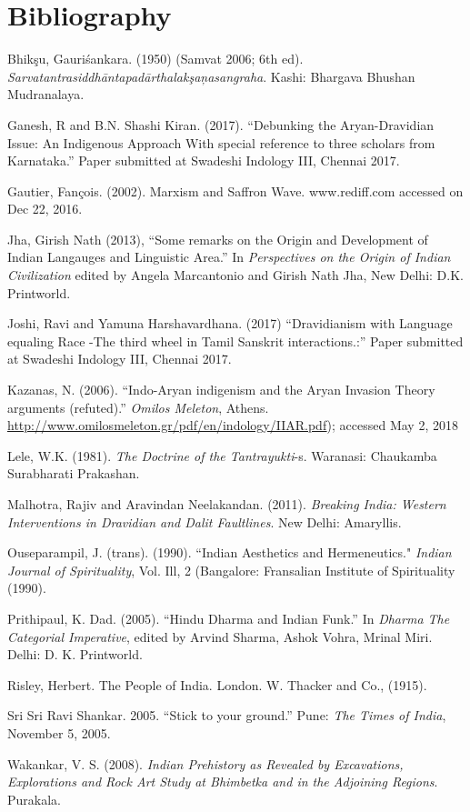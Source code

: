 \section*{Bibliography}

\begin{thebibliography}{99}
\itemsep=0pt
 Bhikşu, Gauriśankara. (1950) (Samvat 2006; 6th ed). \textit{Sarvatantrasiddhāntapadārthalakşaņasangraha}. Kashi: Bhargava Bhushan Mudranalaya.

  Ganesh, R and B.N. Shashi Kiran. (2017). “Debunking the Aryan-Dravidian Issue: An Indigenous Approach With special reference to three scholars from Karnataka.” Paper submitted at Swadeshi Indology III, Chennai 2017.

  Gautier, Fançois. (2002). Marxism and Saffron Wave. www.rediff.com accessed on Dec 22, 2016. 

  Jha, Girish Nath (2013), “Some remarks on the Origin and Development of Indian Langauges and Linguistic Area.” In \textit{Perspectives on the Origin of Indian Civilization} edited by Angela Marcantonio and Girish Nath Jha, New Delhi: D.K. Printworld.

  Joshi, Ravi and Yamuna Harshavardhana. (2017) “Dravidianism with Language equaling Race -The third wheel in Tamil Sanskrit interactions.:” Paper submitted at Swadeshi Indology III, Chennai 2017.

  Kazanas, N. (2006). “Indo-Aryan indigenism and the Aryan Invasion Theory arguments (refuted).” \textit{Omilos Meleton}, Athens. \url{http://www.omilosmeleton.gr/pdf/en/indology/IIAR.pdf}); accessed May 2, 2018

  Lele, W.K. (1981). \textit{The Doctrine of the Tantrayukti}-s. Waranasi: Chaukamba Surabharati Prakashan.

  Malhotra, Rajiv and Aravindan Neelakandan. (2011). \textit{Breaking India: Western Interventions in Dravidian and Dalit Faultlines}. New Delhi: Amaryllis.

  Ouseparampil, J. (trans). (1990). “Indian Aesthetics and Hermeneutics." \textit{Indian Journal of Spirituality}, Vol. Ill, 2 (Bangalore: Fransalian Institute of Spirituality (1990).

  Prithipaul, K. Dad. (2005). “Hindu Dharma and Indian Funk.” In \textit{Dharma The Categorial Imperative}, edited by Arvind Sharma, Ashok Vohra, Mrinal Miri. Delhi: D. K. Printworld.

  Risley, Herbert. The People of India. London. W. Thacker and Co., (1915).

  Sri Sri Ravi Shankar. 2005. “Stick to your ground.” Pune: \textit{The Times of India}, November 5, 2005.

  Wakankar, V. S. (2008). \textit{Indian Prehistory as Revealed by Excavations, Explorations and Rock Art Study at Bhimbetka and in the Adjoining Regions}. Purakala. 

 \end{thebibliography}

